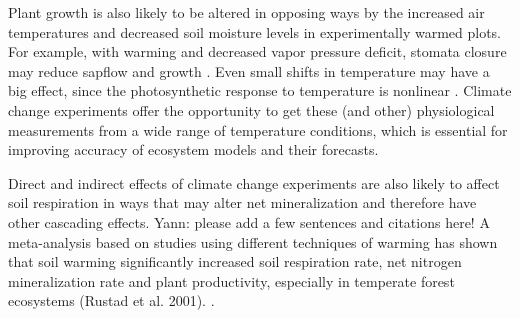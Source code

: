 \documentclass{article}
\begin{document}
\par Plant growth is also likely to be altered in opposing ways by the increased air temperatures and decreased soil moisture levels in experimentally warmed plots. For example, with warming and decreased vapor pressure deficit, stomata closure may reduce sapflow and growth \citep{templer2016}. Even small shifts in temperature may have a big effect, since the photosynthetic response to temperature is nonlinear \citep{berry1980}. Climate change experiments offer the opportunity to get these (and other) physiological measurements from a wide range of temperature conditions, which is essential for improving accuracy of ecosystem models and their forecasts.  %

\par Direct and indirect effects of climate change experiments are also likely to affect soil respiration in ways that may alter net mineralization and therefore have other cascading effects. Yann: please add a few sentences and citations here! \citep{jamieson2015,kharouba2015} A meta-analysis based on studies using different techniques of warming has shown that soil warming significantly increased soil respiration rate, net nitrogen mineralization rate and plant productivity, especially in temperate forest ecosystems (Rustad et al. 2001). %
. %
\end{document}
